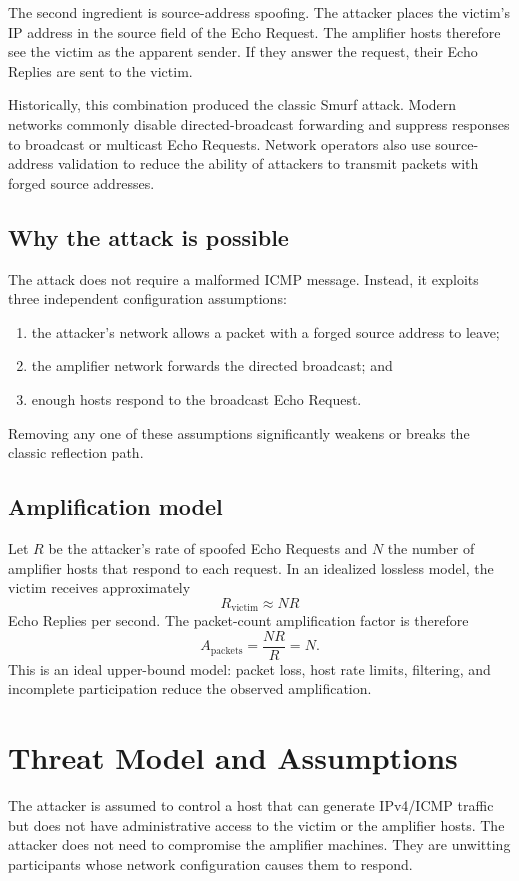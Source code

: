 \documentclass[12pt,a4paper]{article}
\begin{document}
The second ingredient is source-address spoofing. The attacker places the victim's IP address in the source field of the Echo Request. The amplifier hosts therefore see the victim as the apparent sender. If they answer the request, their Echo Replies are sent to the victim.

Historically, this combination produced the classic Smurf attack. Modern networks commonly disable directed-broadcast forwarding and suppress responses to broadcast or multicast Echo Requests. Network operators also use source-address validation to reduce the ability of attackers to transmit packets with forged source addresses.

\subsection{Why the attack is possible}
The attack does not require a malformed ICMP message. Instead, it exploits three independent configuration assumptions:
\begin{enumerate}
\item the attacker's network allows a packet with a forged source address to leave;
\item the amplifier network forwards the directed broadcast; and
\item enough hosts respond to the broadcast Echo Request.
\end{enumerate}
Removing any one of these assumptions significantly weakens or breaks the classic reflection path.

\subsection{Amplification model}
Let $R$ be the attacker's rate of spoofed Echo Requests and $N$ the number of amplifier hosts that respond to each request. In an idealized lossless model, the victim receives approximately
\[
R_{\mathrm{victim}} \approx N R
\]
Echo Replies per second. The packet-count amplification factor is therefore
\[
A_{\mathrm{packets}}=\frac{NR}{R}=N.
\]
This is an ideal upper-bound model: packet loss, host rate limits, filtering, and incomplete participation reduce the observed amplification.

\section{Threat Model and Assumptions}
The attacker is assumed to control a host that can generate IPv4/ICMP traffic but does not have administrative access to the victim or the amplifier hosts. The attacker does not need to compromise the amplifier machines. They are unwitting participants whose network configuration causes them to respond.
\end{document}
